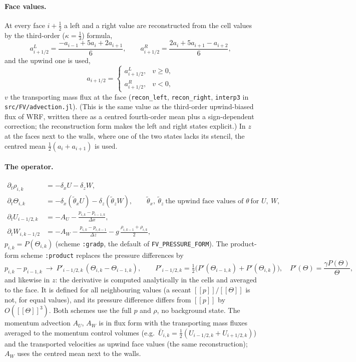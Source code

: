 \documentclass[11pt,a4paper]{article}
\newcommand{\jump}[1]{[\![#1]\!]}
\newcommand{\code}[1]{\texttt{#1}}
\begin{document}
\paragraph{Face values.} At every face $i+\tfrac12$ a left and a right value are reconstructed from the
cell values by the third-order ($\kappa=\tfrac13$) formula,
\[
a^L_{i+1/2}=\frac{-a_{i-1}+5a_i+2a_{i+1}}6,\qquad
a^R_{i+1/2}=\frac{2a_i+5a_{i+1}-a_{i+2}}6,
\]
and the upwind one is used,
\[
a_{i+1/2}=\begin{cases}a^L_{i+1/2},&v\ge0,\\ a^R_{i+1/2},&v<0,\end{cases}
\]
$v$ the transporting mass flux at the face (\code{recon\_left}, \code{recon\_right}, \code{interp3} in
\code{src/FV/advection.jl}). (This is the same value as the third-order upwind-biased flux of WRF, written there
as a centred fourth-order mean plus a sign-dependent correction; the reconstruction form makes the left and
right states explicit.) In $z$ at the faces next to the walls, where one of the two states lacks its
stencil, the centred mean $\tfrac12(a_i+a_{i+1})$ is used.

\paragraph{The operator.}
\begin{align*}
\partial_t\rho_{i,k}&=-\delta_xU-\delta_zW,\\
\partial_t\Theta_{i,k}&=-\delta_x(\tilde\theta_xU)-\delta_z(\tilde\theta_zW),\qquad
\tilde\theta_x,\ \tilde\theta_z\ \text{the upwind face values of }\theta\ \text{for }U,\ W,\\
\partial_tU_{i-1/2,k}&=-A_U-\frac{p_{i,k}-p_{i-1,k}}{\Delta x},\\
\partial_tW_{i,k-1/2}&=-A_W-\frac{p_{i,k}-p_{i,k-1}}{\Delta z}-g\,\frac{\rho_{i,k-1}+\rho_{i,k}}2,
\end{align*}
$p_{i,k}=P(\Theta_{i,k})$ (scheme \code{:gradp}, the default of \code{FV\_PRESSURE\_FORM}). The product-form
scheme \code{:product} replaces the pressure differences by
\[
p_{i,k}-p_{i-1,k}\ \to\ P'_{i-1/2,k}\,(\Theta_{i,k}-\Theta_{i-1,k}),\qquad
P'_{i-1/2,k}=\tfrac12\big(P'(\Theta_{i-1,k})+P'(\Theta_{i,k})\big),\quad P'(\Theta)=\frac{\gamma P(\Theta)}{\Theta},
\]
and likewise in $z$: the derivative is computed analytically in the cells and averaged to the face. It is
defined for all neighbouring values (a secant $\jump p/\jump\Theta$ is not, for equal values), and its pressure
difference differs from $\jump p$ by $O(\jump\Theta^3)$. Both schemes use the full $p$ and $\rho$, no background
state. The momentum advection $A_U$, $A_W$ is in flux form with the transporting mass fluxes
averaged to the momentum control volumes (e.g.\ $\bar U_{i,k}=\tfrac12(U_{i-1/2,k}+U_{i+1/2,k})$) and the
transported velocities as upwind face values (the same reconstruction); $A_W$ uses the centred mean next to the walls.
\end{document}
